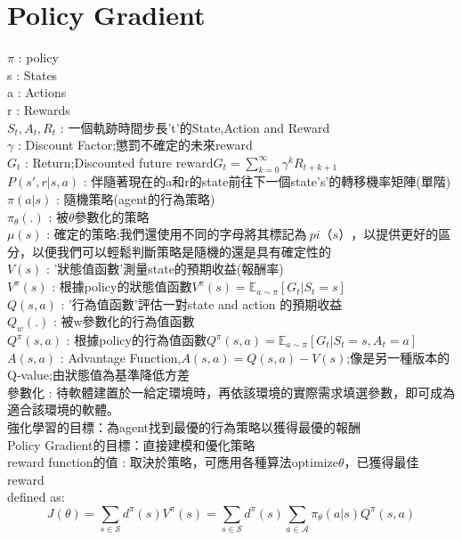 \documentclass[14pt,a4paper]{report}  %
\begin{document}
\section{Policy Gradient}
\hspace{-1.5em}$\pi$ : policy\\[5pt]
s : States\\[5pt]
a : Actions\\[5pt]
r : Rewards\\[5pt]
$S_t,A_t,R_t$ : 一個軌跡時間步長't'的State,Action and Reward \\[5pt]
$\gamma$ : Discount Factor;懲罰不確定的未來reward\\[5pt]
$G_t$ : Return;Discounted future reward$G_t = \sum_{k=0}^{\infty} \gamma^k R_{t+k+1}$\\[5pt]
$P(s', r \vert s, a)$ : 伴隨著現在的a和r的state前往下一個state's'的轉移機率矩陣(單階)\\[5pt]
$\pi(a \vert s)$ : 隨機策略(agent的行為策略)\\[5pt]
$\pi_\theta(.)$ : 被$\theta$參數化的策略\\[5pt]
$\mu(s)$ : 確定的策略;我們還使用不同的字母將其標記為$ \ pi（s）$，以提供更好的區分，以便我們可以輕鬆判斷策略是隨機的還是具有確定性的\\[5pt]
$V(s)$ : '狀態值函數'測量state的預期收益(報酬率)\\[5pt]
$V^\pi(s)$ : 根據policy的狀態值函數$V^\pi (s) = \mathbb{E}_{a\sim \pi} [G_t \vert S_t = s]$\\[5pt]
$Q(s, a)$ : '行為值函數'評估一對state and action 的預期收益\\[5pt]
$Q_w(.)$ : 被w參數化的行為值函數\\[5pt]
$Q^\pi(s, a)$ : 根據policy的行為值函數$Q^\pi(s, a) = \mathbb{E}_{a\sim \pi} [G_t \vert S_t = s, A_t = a]$\\[5pt]
$A(s, a)$ : Advantage Function,$A(s, a) = Q(s, a) - V(s)$;像是另一種版本的Q-value;由狀態值為基準降低方差\\[5pt]
參數化 : 待軟體建置於一給定環境時，再依該環境的實際需求填選參數，即可成為適合該環境的軟體。\\[5pt]
強化學習的目標：為agent找到最優的行為策略以獲得最優的報酬\\[5pt]
Policy Gradient的目標：直接建模和優化策略\\[5pt]
reward function的值 : 取決於策略，可應用各種算法optimize$\theta$，已獲得最佳reward\\[5pt]
defined as:\\[5pt]
$$J(\theta) 
= \sum_{s \in \mathcal{S}} d^\pi(s) V^\pi(s) 
= \sum_{s \in \mathcal{S}} d^\pi(s) \sum_{a \in \mathcal{A}} \pi_\theta(a \vert s) Q^\pi(s, a)$$
\end{document}
